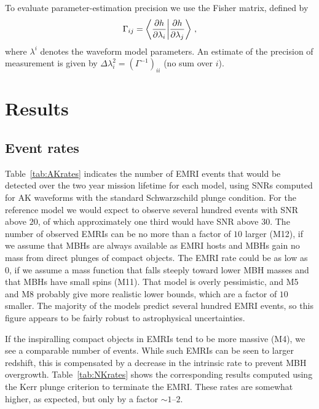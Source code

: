 \documentclass[a4paper]{jpconf}
\begin{document}
To evaluate parameter-estimation precision we use the Fisher matrix, defined by
\begin{equation}
\Gamma_{ij} = \left\langle \frac{\partial h}{\partial \lambda_i} \bigg{|} \frac{\partial h}{\partial \lambda_j} \right \rangle\,,
\end{equation}
where $\lambda^i$ denotes the waveform model parameters. An estimate of the precision of measurement is given by $\Delta \lambda_i ^2 = (\Gamma^{-1})_{ii}$ (no sum over $i$).

\section{Results}
\label{sec:results}
\subsection{Event rates}
Table~\ref{tab:AKrates} indicates the number of EMRI events that would be detected over the two year mission lifetime for each model, using SNRs computed for AK waveforms with the standard Schwarzschild plunge condition. For the reference model we would expect to observe several hundred events with SNR above $20$, of which approximately one third would have SNR above $30$. The number of observed EMRIs can be no more than a factor of $10$ larger (M12), if we assume that MBHs are always available as EMRI hosts and MBHs gain no mass from direct plunges of compact objects. The EMRI rate could be as low as $0$, if we assume a mass function that falls steeply toward lower MBH masses and that MBHs have small spins (M11). That model is overly pessimistic, and M5 and M8 probably give more realistic lower bounds, which are a factor of $10$ smaller. The majority of the models predict several hundred EMRI events, so this figure appears to be fairly robust to astrophysical uncertainties. 

If the inspiralling compact objects in EMRIs tend to be more massive (M4), we see a comparable number of events. While such EMRIs can be seen to larger redshift, this is compensated by a decrease in the intrinsic rate to prevent MBH overgrowth. Table~\ref{tab:NKrates} shows the corresponding results computed using the Kerr plunge criterion to terminate the EMRI. These rates are somewhat higher, as expected, but only by a factor $\sim 1$--$2$.
\end{document}
